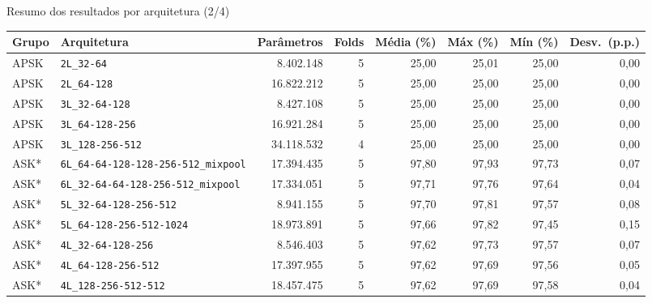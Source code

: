 \documentclass[aspectratio=169,11pt]{beamer}
\begin{document}
\begin{frame}{Resumo dos resultados por arquitetura (2/4)}
  \centering
  \small
  \begin{adjustbox}{max width=\textwidth}
  \begin{tabular}{llrrrrrr}
    \toprule
    Grupo & Arquitetura & Parâmetros & Folds & Média (\%) & Máx (\%) & Mín (\%) & Desv.\ (p.p.) \\
    \midrule
    APSK & \texttt{2L\_32-64} & 8.402.148 & 5 & 25,00 & 25,01 & 25,00 & 0,00 \\
    APSK & \texttt{2L\_64-128} & 16.822.212 & 5 & 25,00 & 25,00 & 25,00 & 0,00 \\
    APSK & \texttt{3L\_32-64-128} & 8.427.108 & 5 & 25,00 & 25,00 & 25,00 & 0,00 \\
    APSK & \texttt{3L\_64-128-256} & 16.921.284 & 5 & 25,00 & 25,00 & 25,00 & 0,00 \\
    APSK & \texttt{3L\_128-256-512} & 34.118.532 & 4 & 25,00 & 25,00 & 25,00 & 0,00 \\
    ASK* & \texttt{6L\_64-64-128-128-256-512\_mixpool} & 17.394.435 & 5 & 97,80 & 97,93 & 97,73 & 0,07 \\
    ASK* & \texttt{6L\_32-64-64-128-256-512\_mixpool} & 17.334.051 & 5 & 97,71 & 97,76 & 97,64 & 0,04 \\
    ASK* & \texttt{5L\_32-64-128-256-512} & 8.941.155 & 5 & 97,70 & 97,81 & 97,57 & 0,08 \\
    ASK* & \texttt{5L\_64-128-256-512-1024} & 18.973.891 & 5 & 97,66 & 97,82 & 97,45 & 0,15 \\
    ASK* & \texttt{4L\_32-64-128-256} & 8.546.403 & 5 & 97,62 & 97,73 & 97,57 & 0,07 \\
    ASK* & \texttt{4L\_64-128-256-512} & 17.397.955 & 5 & 97,62 & 97,69 & 97,56 & 0,05 \\
    ASK* & \texttt{4L\_128-256-512-512} & 18.457.475 & 5 & 97,62 & 97,69 & 97,58 & 0,04 \\
    \bottomrule
  \end{tabular}
  \end{adjustbox}
  \par\vspace{2mm}{\scriptsize * dados do relatório (backups locais); não disponíveis no Drive.}
\end{frame}
\end{document}
